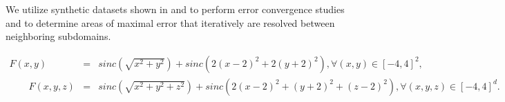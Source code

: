
We utilize synthetic datasets shown in  and  to perform error convergence studies and to determine areas of maximal error that iteratively are resolved between neighboring subdomains.

%
%
%


\begin{eqnarray}
	F(x,y)  &=& sinc(\sqrt{x^2+y^2}) + sinc(2(x - 2)^2 + 2(y + 2)^2), \forall (x,y) \in [-4,4]^2, \label{eqt:2d-synthetic}\\
	\quad \quad F(x,y,z) &=& sinc(\sqrt{x^2 + y^2 + z^2}) + sinc(2(x - 2)^2 + (y + 2)^2 + (z - 2)^2), \forall  (x,y,z) \in [-4,4]^d.
	\label{eqt:3d-synthetic}
\end{eqnarray}

